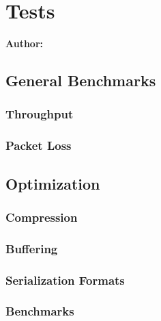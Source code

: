 \chapter{Tests}

\textbf{Author: }

\section{General Benchmarks}
\subsection{Throughput}
\subsection{Packet Loss}

\section{Optimization}
\subsection{Compression}
\subsection{Buffering}
\subsection{Serialization Formats}
\subsection{Benchmarks}

\filbreak